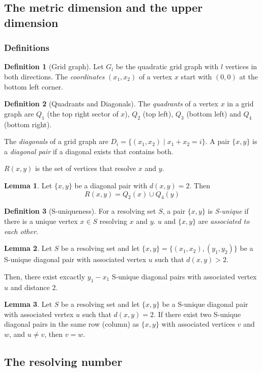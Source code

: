 \documentclass[hyperref={pdfpagelabels=false}]{beamer}
\theoremstyle{definition}
\newtheorem{dfn}{Definition}
\newtheorem{lem}{Lemma}
\begin{document}
\subsection{The metric dimension and the upper dimension}
\begin{frame}
	\frametitle{Definitions}
	\begin{dfn}[Grid graph]
		Let $G_l$ be the quadratic grid graph with $l$ vertices in both directions. The \emph{coordinates} $(x_1,x_2)$ of a vertex $x$ start with $(0,0)$ at the bottom left corner.
	\end{dfn}
	\begin{dfn}[Quadrants and Diagonals]
		The \emph{quadrants} of a vertex $x$ in a grid graph are $Q_1$ (the top right sector of $x$), $Q_2$ (top left), $Q_3$ (bottom left) and $Q_4$ (bottom right).

		The \emph{diagonals} of a grid graph are $D_i = \{ (x_1,x_2) \mid x_1 + x_2 = i \}$. A pair $\{x,y\}$ is a \emph{diagonal pair} if a diagonal exists that contains both.
	\end{dfn}
\end{frame}
\begin{frame}
	$R(x,y)$ is the set of vertices that resolve $x$ and $y$.
	\begin{lem}
		Let $\{x,y\}$ be a diagonal pair with $d(x,y) = 2$. Then
		\[ R(x,y) = Q_2(x) \cup Q_4(y) \]
	\end{lem}
	\begin{dfn}[S-uniqueness]
		For a resolving set $S$, a pair $\{x,y\}$ is \emph{S-unique} if there is a unique vertex $x \in S$ resolving $x$ and $y$. $u$ and $\{x,y\}$ are \emph{associated to each other}.
	\end{dfn}
\end{frame}
\begin{frame}
	\begin{lem}
		Let $S$ be a resolving set and let $\{x,y\} = \{(x_1,x_2),(y_1,y_2)\}$ be a S-unique diagonal pair with associated vertex $u$ such that $d(x,y)>2$.

		Then, there exist excactly $y_1 - x_1$ S-unique diagonal pairs with associated vertex $u$ and distance $2$.
	\end{lem}
\end{frame}
\begin{frame}
	\begin{lem}
		Let $S$ be a resolving set and let $\{x,y\}$ be a S-unique diagonal pair with associated vertex $u$ such that $d(x,y)=2$. If there exist two S-unique diagonal pairs in the same row (column) as $\{x,y\}$ with associated vertices $v$ and $w$, and $u \neq v$, then $v = w$.
	\end{lem}
\end{frame}
\subsection{The resolving number}
\begin{frame}
\end{frame}
\end{document}
